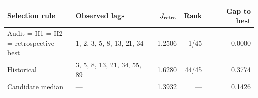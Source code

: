 \begin{tabular}{llrrr}
\toprule
Selection rule & Observed lags & $J_{\rm retro}$ & Rank & Gap to best \\
\midrule
\shortstack[l]{Audit = H1 = H2\\= retrospective best} & 1, 2, 3, 5, 8, 13, 21, 34 & 1.2506 & 1/45 & 0.0000 \\
Historical & 3, 5, 8, 13, 21, 34, 55, 89 & 1.6280 & 44/45 & 0.3774 \\
Candidate median & --- & 1.3932 & --- & 0.1426 \\
\bottomrule
\end{tabular}
